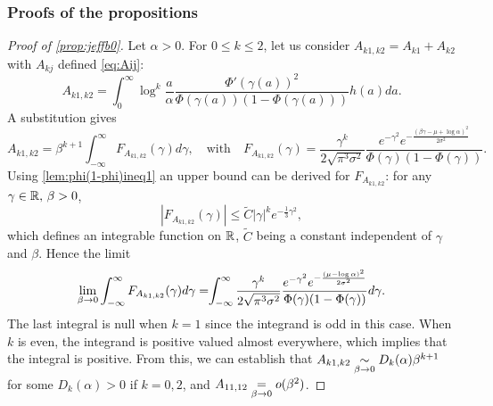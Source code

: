 \subsubsection{Proofs of the propositions}
\begin{proof}[Proof of \cref{prop:jeffb0}]
    Let $\alpha>0$. For $0\leq k\leq2$, let us consider $A_{k1,k2}=A_{k1}+A_{k2}$ with $A_{kj}$ defined \cref{eq:Aij}:
\begin{equation}
    A_{k1,k2} =  \int_{0}^{\infty}\log^k\frac{a}{\alpha}\frac{\Phi'(\gamma(a))^2}{\Phi(\gamma(a))(1-\Phi(\gamma(a)))}h(a)da .
\end{equation}
A substitution gives
    \begin{equation}
        \label{eq:AkAk}
        A_{k1,k2} =   \beta^{k+1}\int_{-\infty}^\infty  F_{A_{k1,k2}}(\gamma)d\gamma , \quad\text{with}\quad
        F_{A_{k1,k2}}(\gamma) =  \frac{\gamma^k}{2\sqrt{\pi^3\sigma^2}} \frac{e^{-\gamma^2}e^{-\frac{(\beta\gamma-\mu+\log\alpha)^2}{2\sigma^2}}}{\Phi(\gamma)(1-\Phi(\gamma))} .
    \end{equation}
Using \cref{lem:phi(1-phi)ineq1} an upper bound can be derived for $F_{A_{k1,k2}}$: for any $\gamma\in\mathbb{R},\,\beta>0$,
\begin{equation}\label{eq:Jasymp:majFkk}
    |F_{A_{k1,k2}}(\gamma)|\leq \tilde C|\gamma|^ke^{-\frac{1}{3}\gamma^2},
\end{equation}
which defines an integrable function on $\mathbb{R}$, $\tilde C$ being a constant independent of $\gamma$ and $\beta$. Hence the limit
\begin{equation}
    \lim_{\beta\rightarrow0}\int_{-\infty}^\infty F_{A_{k1,k2}}(\gamma)d\gamma =\hspace*{-3pt} \int_{-\infty}^\infty \frac{\gamma^k}{2\sqrt{\pi^3\sigma^2}}\frac{e^{-\gamma^2}e^{-\frac{(\mu-\log\alpha)^2}{2\sigma^2}}}{\Phi(\gamma)(1-\Phi(\gamma))}d\gamma.
\end{equation}
{%
The last integral is null when $k=1$ since the integrand is odd in this case.
When $k$ is even, the integrand is positive valued almost everywhere, which implies that the integral is positive. 
From this, we can establish that  $A_{k1,k2}\underset{\beta\rightarrow0}{\sim}D_k(\alpha)\beta^{k+1}$ for some $D_k(\alpha)>0$ if $k=0,2$, and $A_{11,12}\overset{}{\underset{\beta\rightarrow0}{=}}o(\beta^2)$.}


\end{proof}
